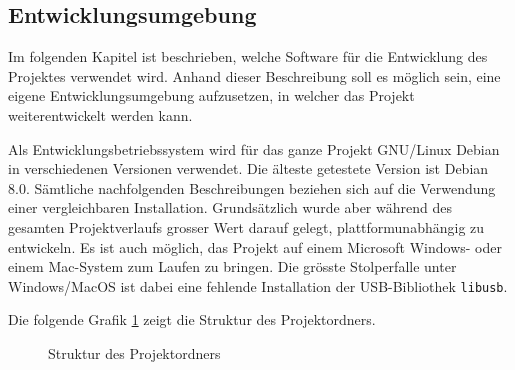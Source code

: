 \clearpage
\subsection{Entwicklungsumgebung}\label{sec:entwicklungsumgebung}
Im folgenden Kapitel ist beschrieben, welche Software für die Entwicklung des Projektes verwendet wird. Anhand dieser Beschreibung soll es möglich sein, eine eigene Entwicklungsumgebung aufzusetzen, in welcher das Projekt weiterentwickelt werden kann.

Als Entwicklungsbetriebssystem wird für das ganze Projekt GNU/Linux Debian in verschiedenen Versionen verwendet. Die älteste getestete Version ist Debian 8.0. Sämtliche nachfolgenden Beschreibungen beziehen sich auf die Verwendung einer vergleichbaren Installation. Grundsätzlich wurde aber während des gesamten Projektverlaufs grosser Wert darauf gelegt, plattformunabhängig zu entwickeln. Es ist auch möglich, das Projekt auf einem Microsoft Windows- oder einem Mac-System zum Laufen zu bringen. Die grösste Stolperfalle unter Windows/MacOS ist dabei eine fehlende Installation der USB-Bibliothek \texttt{libusb}.

Die folgende Grafik \ref{fig:image_software_folder_structure} zeigt die Struktur des Projektordners.
\begin{figure}[htb]
\caption{Struktur des Projektordners} %
\label{fig:image_software_folder_structure}
\end{figure}

